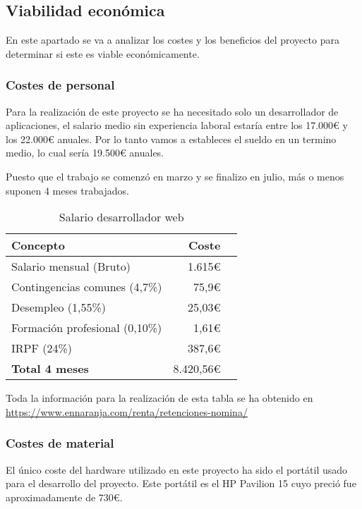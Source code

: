 \subsection{Viabilidad económica}

En este apartado se va a analizar los costes y los beneficios del proyecto para determinar si este es viable económicamente.

\subsubsection{Costes de personal}

Para la realización de este proyecto se ha necesitado solo un desarrollador de aplicaciones, el salario medio sin experiencia laboral estaría entre los 17.000€ y los 22.000€ anuales. Por lo tanto vamos a estableces el sueldo en un termino medio, lo cual sería 19.500€ anuales.

Puesto que el trabajo se comenzó en marzo y se finalizo en julio, más o menos suponen 4 meses trabajados.

\begin{table}[H]
	 \begin{tabularx}{\linewidth}{X r r}
	 	\toprule \textbf{Concepto} & \textbf{Coste} \\
	 	\toprule
        Salario mensual (Bruto) &  1.615€\\
        Contingencias comunes (4,7\%) & 75,9€ \\
        Desempleo (1,55\%) & 25,03€\\
        Formación profesional (0,10\%) & 1,61€\\
        IRPF (24\%) & 387,6€   \\
        \midrule
	    \textbf{Total 4 meses} & 8.420,56€  \\
	 	\bottomrule
	 \end{tabularx}
	 \caption{Salario desarrollador web}
\end{table}

Toda la información para la realización de esta tabla se ha obtenido en \href{https://www.ennaranja.com/renta/retenciones-nomina/}{https://www.ennaranja.com/renta/retenciones-nomina/}
\newpage

\subsubsection{Costes de material}

El único coste del hardware utilizado en este proyecto ha sido el portátil usado para el desarrollo del proyecto. Este portátil es el HP Pavilion 15 cuyo preció fue aproximadamente de 730€.

